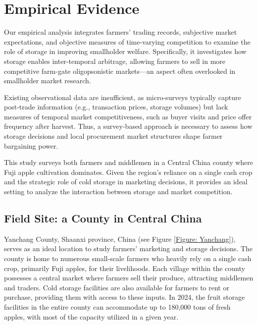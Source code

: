 \section{Empirical Evidence}

\noindent Our empirical analysis integrates farmers' trading records, subjective market expectations, and objective measures of time-varying competition to examine the role of storage in improving smallholder welfare. Specifically, it investigates how storage enables inter-temporal arbitrage, allowing farmers to sell in more competitive farm-gate oligopsonistic markets—an aspect often overlooked in smallholder market research.

Existing observational data are insufficient, as micro-surveys typically capture post-trade information (e.g., transaction prices, storage volumes) but lack measures of temporal market competitiveness, such as buyer visits and price offer frequency after harvest. Thus, a survey-based approach is necessary to assess how storage decisions and local procurement market structures shape farmer bargaining power.

This study surveys both farmers and middlemen in a Central China county where Fuji apple cultivation dominates. Given the region's reliance on a single cash crop and the strategic role of cold storage in marketing decisions, it provides an ideal setting to analyze the interaction between storage and market competition.


\subsection{Field Site: a County in Central China}
\noindent Yanchang County, Shaanxi province, China (see Figure \ref{Figure: Yanchang}), serves as an ideal location to study farmers' marketing and storage decisions. The county is home to numerous small-scale farmers who heavily rely on a single cash crop, primarily Fuji apples, for their livelihoods. Each village within the county possesses a central market where farmers sell their produce, attracting middlemen and traders. Cold storage facilities are also available for farmers to rent or purchase, providing them with access to these inputs. In 2024, the fruit storage facilities in the entire county can accommodate up to 180,000 tons of fresh apples, with most of the capacity utilized in a given year.

